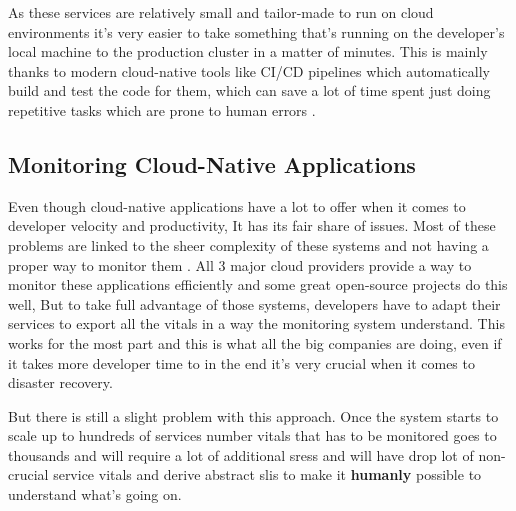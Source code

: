 As these services are relatively small and tailor-made to run on cloud environments it's very easier to take something that's running on the developer's local machine to the production cluster in a matter of minutes. This is mainly thanks to modern cloud-native tools like CI/CD pipelines which automatically build and test the code for them, which can save a lot of time spent just doing repetitive tasks which are prone to human errors \citep{Whataret68:online}.

\subsection{Monitoring Cloud-Native Applications} \label{monitoring-bg}
Even though cloud-native applications have a lot to offer when it comes to developer velocity and productivity, It has its fair share of issues. Most of these problems are linked to the sheer complexity of these systems and not having a proper way to monitor them \citep{5WaysYou35:online}. All 3 major cloud providers provide a way to monitor these applications efficiently and some great open-source projects do this well, But to take full advantage of those systems, developers have to adapt their services to export all the vitals in a way the monitoring system understand. This works for the most part and this is what all the big companies are doing, even if it takes more developer time to in the end it's very crucial when it comes to disaster recovery.

But there is still a slight problem with this approach. Once the system starts to scale up to hundreds of services number vitals that has to be monitored goes to thousands and will require a lot of additional \acp{sres} and will have drop lot of non-crucial service vitals and derive abstract \acp{sli} to make it \textbf{humanly} possible to understand what's going on.\\
